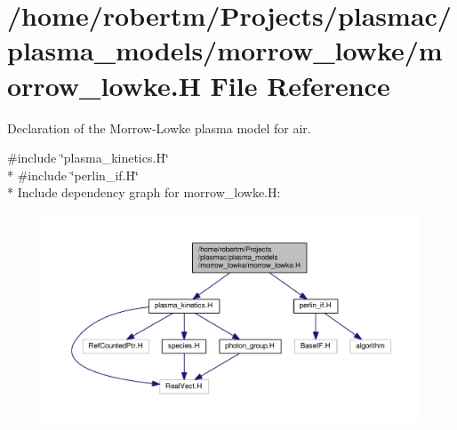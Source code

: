 \hypertarget{morrow__lowke_8H}{}\section{/home/robertm/\+Projects/plasmac/plasma\+\_\+models/morrow\+\_\+lowke/morrow\+\_\+lowke.H File Reference}
\label{morrow__lowke_8H}


Declaration of the Morrow-\/\+Lowke plasma model for air.  


{\ttfamily \#include \char`\"{}plasma\+\_\+kinetics.\+H\char`\"{}}\\*
{\ttfamily \#include \char`\"{}perlin\+\_\+if.\+H\char`\"{}}\\*
Include dependency graph for morrow\+\_\+lowke.\+H\+:\nopagebreak
\begin{figure}[H]
\begin{center}
\leavevmode
\includegraphics[width=350pt]{morrow__lowke_8H__incl}
\end{center}
\end{figure}

